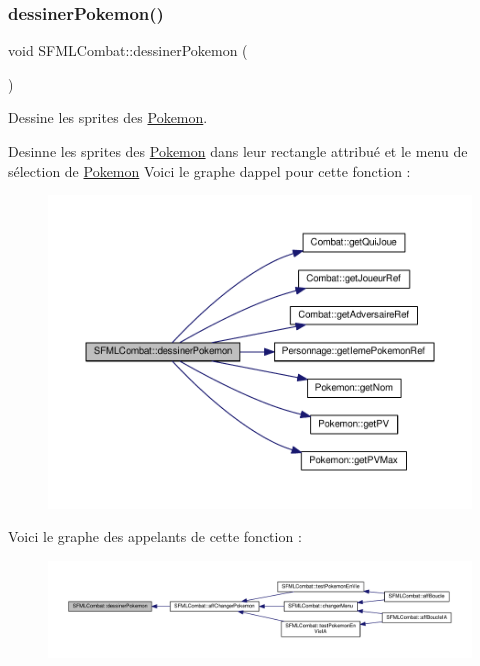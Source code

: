 \subsubsection{\texorpdfstring{dessiner\+Pokemon()}{dessinerPokemon()}}
{\footnotesize\ttfamily void S\+F\+M\+L\+Combat\+::dessiner\+Pokemon (\begin{DoxyParamCaption}{ }\end{DoxyParamCaption})\hspace{0.3cm}{\ttfamily [private]}}



Dessine les sprites des \hyperlink{class_pokemon}{Pokemon}. 

Desinne les sprites des \hyperlink{class_pokemon}{Pokemon} dans leur rectangle attribué et le menu de sélection de \hyperlink{class_pokemon}{Pokemon} Voici le graphe d\textquotesingle{}appel pour cette fonction \+:\nopagebreak
\begin{figure}[H]
\begin{center}
\leavevmode
\includegraphics[width=350pt]{class_s_f_m_l_combat_a22523f39138086a3b118a896ca214c4d_cgraph}
\end{center}
\end{figure}
Voici le graphe des appelants de cette fonction \+:\nopagebreak
\begin{figure}[H]
\begin{center}
\leavevmode
\includegraphics[width=350pt]{class_s_f_m_l_combat_a22523f39138086a3b118a896ca214c4d_icgraph}
\end{center}
\end{figure}
\mbox{\label{class_s_f_m_l_combat_a578125c9faee0eebfaa898b5d6ae6f6e}} 

